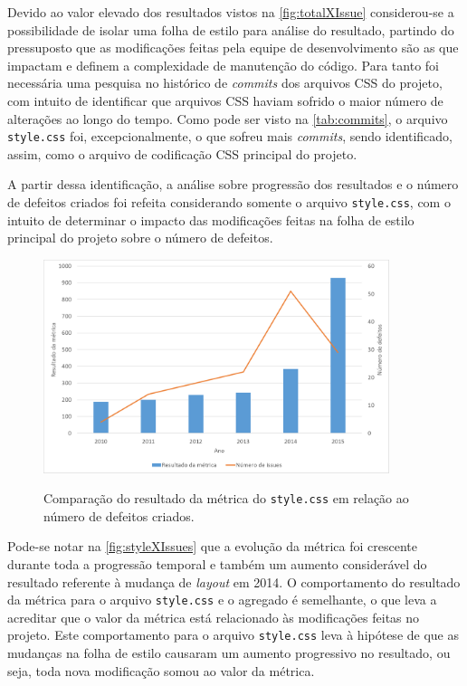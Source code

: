 Devido ao valor elevado dos resultados vistos na \autoref{fig:totalXIssue} considerou-se a possibilidade de isolar uma folha de estilo para análise do resultado, partindo do pressuposto que as modificações feitas pela equipe de desenvolvimento são as que impactam e definem a complexidade de manutenção do código. Para tanto foi necessária uma pesquisa no histórico de \textit{commits} dos arquivos CSS do projeto, com intuito de identificar que arquivos CSS haviam sofrido o maior número de alterações ao longo do tempo. Como pode ser visto na \autoref{tab:commits}, o arquivo \texttt{style.css} foi, excepcionalmente, o que sofreu mais \textit{commits}, sendo identificado, assim, como o arquivo de codificação CSS principal do projeto.



A partir dessa identificação, a análise sobre progressão dos resultados e o número de defeitos criados foi refeita considerando somente o arquivo \texttt{style.css}, com o intuito de determinar o impacto das modificações feitas na folha de estilo principal do projeto sobre o número de defeitos.

\begin{figure}[!htb]
	\centering
	\caption{Comparação do resultado da métrica do \texttt{style.css} em relação ao número de defeitos criados.}
	\includegraphics[width=0.9\textwidth]{./04-figuras/style_issues}
	\label{fig:styleXIssues}
\end{figure}

Pode-se notar na \autoref{fig:styleXIssues} que a evolução da métrica foi crescente durante toda a progressão temporal e também um aumento considerável do resultado referente à mudança de \textit{layout} em 2014.
O comportamento do resultado da métrica para o arquivo \texttt{style.css} e o agregado é semelhante, o que leva a acreditar que o valor da métrica está relacionado às modificações feitas no projeto. Este comportamento para o arquivo \texttt{style.css} leva à hipótese de que as mudanças na folha de estilo causaram um aumento progressivo no resultado, ou seja, toda nova modificação somou ao valor da métrica.

